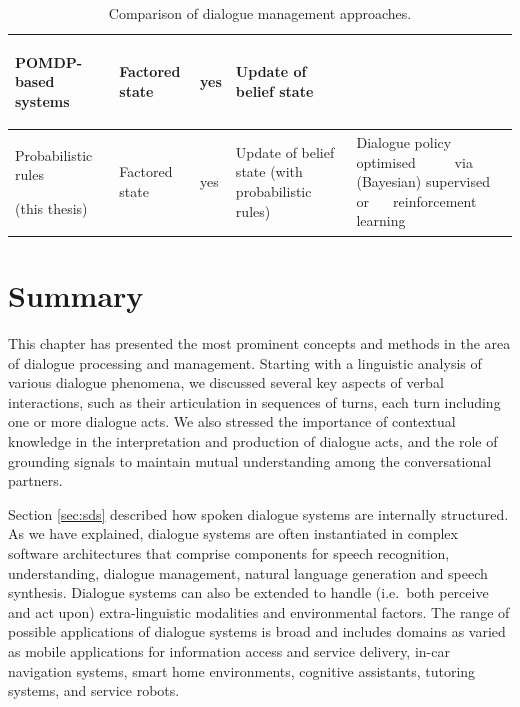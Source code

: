 \begin{table}
\begin{center}
\begin{tabular}{|p{55mm}||p{29mm}|p{16mm}|p{50mm}|p{52mm}|}
POMDP-based systems \; \; \; \; \; \; \begin{footnotesize}\citep[e.g.][]{Young:2010}\end{footnotesize}\vspace{5pt} & Factored state & yes & Update of belief state & \vspace{5pt} \\ \hline
Probabilistic rules \; \; \; \; \; \; \; \; \; \; \begin{footnotesize} (this thesis)\end{footnotesize} & Factored state & yes & Update of belief state \; \; \; \; \; \; (with probabilistic rules) & Dialogue policy optimised $\phantom{aaaa}$ via (Bayesian) supervised or $\phantom{aa}$ reinforcement learning \vspace{5pt} \\ \hline 
\end{tabular}
\end{center}
\caption{Comparison of dialogue management approaches.}
\label{table:approaches}
\end{table}


\section{Summary}

This chapter has presented the most prominent concepts and methods in the area of dialogue processing and management.  Starting with a linguistic analysis of various dialogue phenomena, we discussed several key aspects of verbal interactions, such as their articulation in sequences of turns, each turn including one or more dialogue acts. We also stressed the importance of contextual knowledge in the interpretation and production of dialogue acts, and the role of grounding signals to maintain mutual understanding among the conversational partners. 

Section \ref{sec:sds} described how spoken dialogue systems are internally structured. As we have explained, dialogue systems are often instantiated in complex software architectures that comprise components for speech recognition, understanding, dialogue management, natural language generation and speech synthesis.  Dialogue systems can also be extended to handle (i.e.\ both perceive and act upon) extra-linguistic modalities and environmental factors. The range of possible applications of dialogue systems is broad and includes domains as varied as mobile applications for information access and service delivery, in-car navigation systems, smart home environments, cognitive assistants, tutoring systems, and service robots. 

